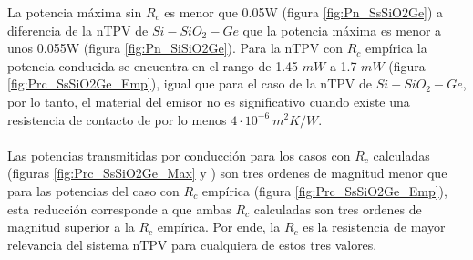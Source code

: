 La potencia máxima sin $R_c$ es menor que 0.05W (figura \ref{fig:Pn_SsSiO2Ge}) a diferencia de la nTPV de $Si-SiO_2-Ge$ que la potencia máxima es menor a unos 0.055W (figura \ref{fig:Pn_SiSiO2Ge}). Para la nTPV con $R_c$ empírica la potencia conducida se encuentra en el rango de 1.45 $mW$ a 1.7 $mW$ (figura \ref{fig:Prc_SsSiO2Ge_Emp}), igual que para el caso de la nTPV de $Si-SiO_2-Ge$, por lo tanto, el material del emisor no es significativo cuando existe una resistencia de contacto de por lo menos $4\cdot 10^{-6} \ m^2 K/W$.\\\\
Las potencias transmitidas por conducción para los casos con $R_c$ calculadas (figuras \ref{fig:Prc_SsSiO2Ge_Max}  y ) son tres ordenes de magnitud menor que para las potencias del caso con $R_c$ empírica (figura \ref{fig:Prc_SsSiO2Ge_Emp}), esta reducción corresponde a que ambas $R_c$ calculadas son tres ordenes de magnitud superior a la $R_c$ empírica. Por ende, la $R_c$ es la resistencia de mayor relevancia del sistema nTPV para cualquiera de estos tres valores.
